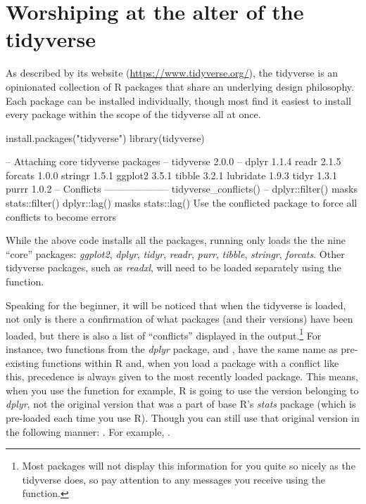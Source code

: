 \section{Worshiping at the alter of the tidyverse}
\label{sec:tidyverse}

As described by its website (\url{https://www.tidyverse.org/}), the \gls{tidyverse} is an opinionated collection of R packages that share an underlying design philosophy. Each package can be installed individually, though most find it easiest to install every package within the scope of the tidyverse all at once.


\begin{inR}
install.packages("tidyverse")
library(tidyverse)
\end{inR}

\begin{outR}
-- Attaching core tidyverse packages -- tidyverse 2.0.0 --
 dplyr     1.1.4      readr     2.1.5
 forcats   1.0.0      stringr   1.5.1
 ggplot2   3.5.1      tibble    3.2.1
 lubridate 1.9.3      tidyr     1.3.1
 purrr     1.0.2     
-- Conflicts -------------------- tidyverse_conflicts() --
 dplyr::filter() masks stats::filter()
 dplyr::lag()    masks stats::lag()
 Use the conflicted package to force all conflicts to
 become errors
\end{outR}

While the above code installs all the packages, running  only loads the the nine ``core'' packages:  \textit{ggplot2}, \textit{dplyr}, \textit{tidyr}, \textit{readr}, \textit{purr}, \textit{tibble}, \textit{stringr}, \textit{forcats}. Other tidyverse packages, such as \textit{readxl}, will need to be loaded separately using the  function.

Speaking for the beginner, it will be noticed that when the tidyverse is loaded, not only is there a confirmation of what packages (and their versions) have been loaded, but there is also a list of ``conflicts'' displayed in the output.\footnote{Most packages will not display this information for you quite so nicely as the tidyverse does, so pay attention to any messages you receive using the  function.} For instance, two functions from the \textit{dplyr} package,  and , have the same name as pre-existing functions within R and, when you load a package with a conflict like this, precedence is always given to the most recently loaded package. This means, when you use the  function for example, R is going to use the version belonging to \textit{dplyr}, not the original version that was a part of base R's \textit{stats} package (which is pre-loaded each time you use R). Though you can still use that original version in the following manner: .  For example, . 

